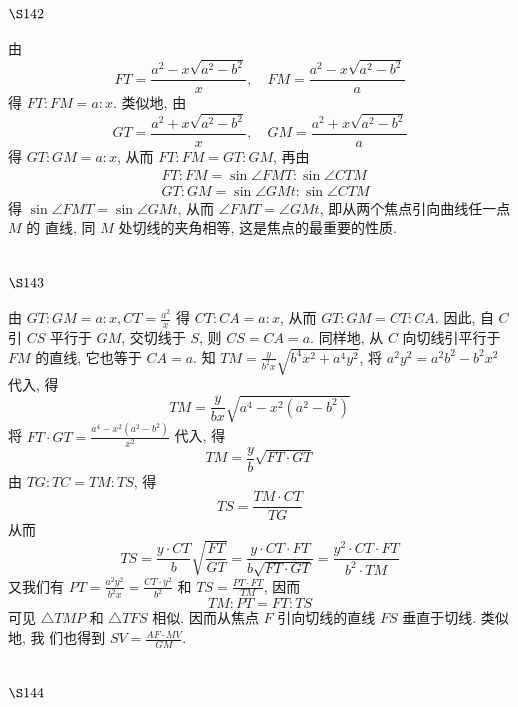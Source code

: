 \section{$\S 142$}

由
\[
F T=\frac{a^{2}-x \sqrt{a^{2}-b^{2}}}{x}, \quad F M=\frac{a^{2}-x \sqrt{a^{2}-b^{2}}}{a}
\]
得 $F T: F M=a: x$. 类似地, 由
\[
G T=\frac{a^{2}+x \sqrt{a^{2}-b^{2}}}{x}, \quad G M=\frac{a^{2}+x \sqrt{a^{2}-b^{2}}}{a}
\]
得 $G T: G M=a: x$, 从而 $F T: F M=G T: G M$, 再由
\[
\begin{aligned}
& F T: F M=\sin \angle F M T: \sin \angle C T M \\
& G T: G M=\sin \angle G M t: \sin \angle C T M
\end{aligned}
\]
得 $\sin \angle F M T=\sin \angle G M t$, 从而 $\angle F M T=\angle G M t$, 即从两个焦点引向曲线任一点 $M$ 的 直线, 同 $M$ 处切线的夹角相等, 这是焦点的最重要的性质.

\section{$\S 143$}

由 $G T: G M=a: x, C T=\frac{a^{2}}{x}$ 得 $C T: C A=a: x$, 从而 $G T: G M=C T: C A$. 因此, 自 $C$ 引 $C S$ 平行于 $G M$, 交切线于 $S$, 则 $C S=C A=a$. 同样地, 从 $C$ 向切线引平行于 $F M$ 的直线, 它也等于 $C A=a$. 知 $T M=\frac{y}{b^{2} x} \sqrt{b^{4} x^{2}+a^{4} y^{2}}$, 将 $a^{2} y^{2}=a^{2} b^{2}-b^{2} x^{2}$ 代入, 得
\[
T M=\frac{y}{b x} \sqrt{a^{4}-x^{2}\left(a^{2}-b^{2}\right)}
\]
将 $F T \cdot G T=\frac{a^{4}-x^{2}\left(a^{2}-b^{2}\right)}{x^{2}}$ 代入, 得
\[
T M=\frac{y}{b} \sqrt{F T \cdot G T}
\]
由 $T G: T C=T M: T S$, 得
\[
T S=\frac{T M \cdot C T}{T G}
\]
从而
\[
T S=\frac{y \cdot C T}{b} \sqrt{\frac{F T}{G T}}=\frac{y \cdot C T \cdot F T}{b \sqrt{F T \cdot G T}}=\frac{y^{2} \cdot C T \cdot F T}{b^{2} \cdot T M}
\]
又我们有 $P T=\frac{a^{2} y^{2}}{b^{2} x}=\frac{C T \cdot y^{2}}{b^{2}}$ 和 $T S=\frac{P T \cdot F T}{T M}$, 因而
\[
T M: P T=F T: T S
\]
可见 $\triangle T M P$ 和 $\triangle T F S$ 相似. 因而从焦点 $F$ 引向切线的直线 $F S$ 垂直于切线. 类似地, 我 们也得到 $S V=\frac{A F \cdot M V}{G M}$.

\section{$\S 144$}

